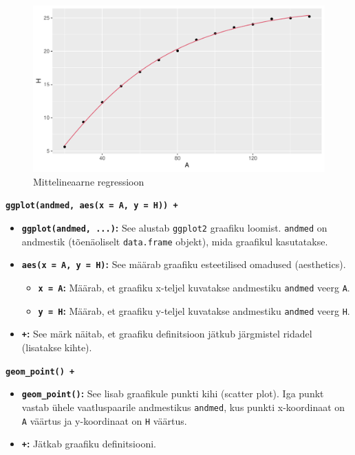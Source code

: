 \documentclass[
]{book}
\providecommand{\tightlist}{%
  \setlength{\itemsep}{0pt}\setlength{\parskip}{0pt}}
\theoremstyle{definition}
\theoremstyle{definition}
\theoremstyle{definition}
\theoremstyle{definition}
\theoremstyle{remark}
\begin{document}
\begin{figure}[H]
\includegraphics[width=0.8\linewidth]{_main_files/figure-latex/unnamed-chunk-53-1} \caption{Mittelineaarne regressioon}\label{fig:unnamed-chunk-53}
\end{figure}

\textbf{\texttt{ggplot(andmed,\ aes(x\ =\ A,\ y\ =\ H))\ +}}

\begin{itemize}
\tightlist
\item
  \textbf{\texttt{ggplot(andmed,\ ...)}:} See alustab \texttt{ggplot2} graafiku loomist. \texttt{andmed} on andmestik (tõenäoliselt \texttt{data.frame} objekt), mida graafikul kasutatakse.
\item
  \textbf{\texttt{aes(x\ =\ A,\ y\ =\ H)}:} See määrab graafiku esteetilised omadused (aesthetics).

  \begin{itemize}
  \tightlist
  \item
    \textbf{\texttt{x\ =\ A}:} Määrab, et graafiku x-teljel kuvatakse andmestiku \texttt{andmed} veerg \texttt{A}.
  \item
    \textbf{\texttt{y\ =\ H}:} Määrab, et graafiku y-teljel kuvatakse andmestiku \texttt{andmed} veerg \texttt{H}.
  \end{itemize}
\item
  \textbf{\texttt{+}:} See märk näitab, et graafiku definitsioon jätkub järgmistel ridadel (lisatakse kihte).
\end{itemize}

\textbf{\texttt{geom\_point()\ +}}

\begin{itemize}
\tightlist
\item
  \textbf{\texttt{geom\_point()}:} See lisab graafikule punkti kihi (scatter plot). Iga punkt vastab ühele vaatluspaarile andmestikus \texttt{andmed}, kus punkti x-koordinaat on \texttt{A} väärtus ja y-koordinaat on \texttt{H} väärtus.
\item
  \textbf{\texttt{+}:} Jätkab graafiku definitsiooni.
\end{itemize}
\end{document}
